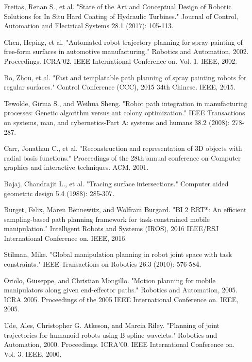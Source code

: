 \documentclass[letterpaper, 10 pt, conference]{ieeeconf}  %
\begin{document}
\begin{thebibliography}{99}

 Freitas, Renan S., et al. "State of the Art and Conceptual Design
of Robotic Solutions for In Situ Hard Coating of Hydraulic Turbines." Journal of
Control, Automation and Electrical Systems 28.1 (2017): 105-113.


 Chen, Heping, et al. "Automated robot trajectory planning for spray
painting of free-form surfaces in automotive manufacturing." Robotics and
Automation, 2002. Proceedings. ICRA'02. IEEE International Conference on. Vol.
1. IEEE, 2002.

 Bo, Zhou, et al. "Fast and templatable path planning of spray
painting robots for regular surfaces." Control Conference (CCC), 2015 34th Chinese. IEEE, 2015.


 Tewolde, Girma S., and Weihua Sheng. "Robot path integration in
manufacturing processes: Genetic algorithm versus ant colony optimization." IEEE
Transactions on systems, man, and cybernetics-Part A: systems and humans 38.2
(2008): 278-287.

 Carr, Jonathan C., et al. "Reconstruction and representation of 3D
objects with radial basis functions." Proceedings of the 28th annual conference
on Computer graphics and interactive techniques. ACM, 2001.

 Bajaj, Chandrajit L., et al. "Tracing surface intersections."
Computer aided geometric design 5.4 (1988): 285-307.

 Burget, Felix, Maren Bennewitz, and Wolfram Burgard. "BI 2 RRT*: An
efficient sampling-based path planning framework for task-constrained mobile manipulation." Intelligent Robots and Systems (IROS), 2016 IEEE/RSJ International Conference on. IEEE, 2016.

 Stilman, Mike. "Global manipulation planning in robot joint space
with task constraints." IEEE Transactions on Robotics 26.3 (2010): 576-584.

 Oriolo, Giuseppe, and Christian Mongillo. "Motion planning for
mobile manipulators along given end-effector paths." Robotics and Automation, 2005. ICRA 2005. Proceedings of the 2005 IEEE International Conference on. IEEE, 2005.

 Ude, Ales, Christopher G. Atkeson, and Marcia Riley. "Planning of
joint trajectories for humanoid robots using B-spline wavelets." Robotics and Automation, 2000. Proceedings. ICRA'00. IEEE International Conference on. Vol. 3. IEEE, 2000.


\end{thebibliography}
\end{document}
